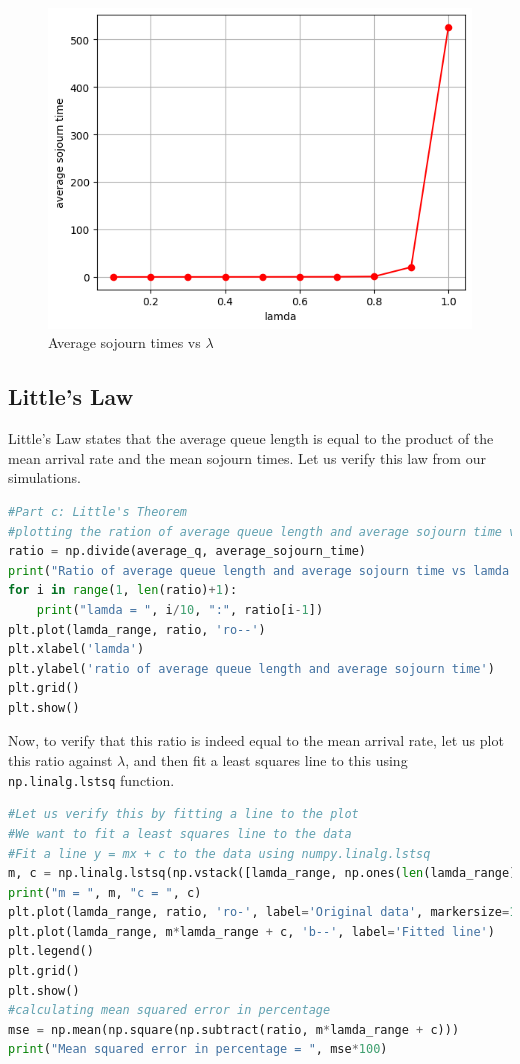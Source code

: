 \documentclass[11pt, a4paper]{article}
\begin{document}
\begin{figure}[H]
     \centering
     \includegraphics[scale=0.6]{Figure_5.png}
     \caption{Average sojourn times vs $\lambda$}
\end{figure}

\subsection{Little's Law}
Little's Law states that the average queue length is equal to the product of the mean arrival rate and the mean sojourn times. Let us verify this law from our simulations. 

\begin{lstlisting}[language = Python]
#Part c: Little's Theorem
#plotting the ration of average queue length and average sojourn time vs lamda
ratio = np.divide(average_q, average_sojourn_time)
print("Ratio of average queue length and average sojourn time vs lamda:")
for i in range(1, len(ratio)+1):
    print("lamda = ", i/10, ":", ratio[i-1])
plt.plot(lamda_range, ratio, 'ro--')
plt.xlabel('lamda')
plt.ylabel('ratio of average queue length and average sojourn time')
plt.grid()
plt.show()
\end{lstlisting}

Now, to verify that this ratio is indeed equal to the mean arrival rate, let us plot this ratio against $\lambda$, and then fit a least squares line to this using \texttt{np.linalg.lstsq} function.

\begin{lstlisting}[language = Python]
#Let us verify this by fitting a line to the plot
#We want to fit a least squares line to the data
#Fit a line y = mx + c to the data using numpy.linalg.lstsq
m, c = np.linalg.lstsq(np.vstack([lamda_range, np.ones(len(lamda_range))]).T, ratio, rcond = None)[0]
print("m = ", m, "c = ", c)
plt.plot(lamda_range, ratio, 'ro-', label='Original data', markersize=10)
plt.plot(lamda_range, m*lamda_range + c, 'b--', label='Fitted line')
plt.legend()
plt.grid()
plt.show()
#calculating mean squared error in percentage
mse = np.mean(np.square(np.subtract(ratio, m*lamda_range + c)))
print("Mean squared error in percentage = ", mse*100)
\end{lstlisting}
\end{document}
